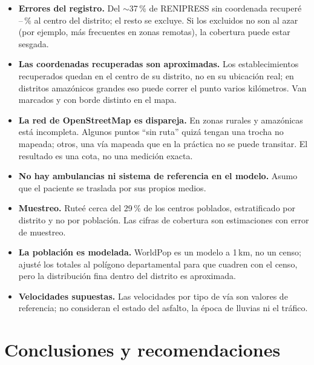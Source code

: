 \documentclass[12pt,a4paper]{article}
\newcommand{\FloatBarrier}{\par\bigskip}    %
\providecommand{\fraccionMuestra}{29}
\providecommand{\tasaRecuperacion}{--}
\begin{document}
\begin{itemize}
\item \textbf{Errores del registro.} Del $\sim$37\,\% de RENIPRESS sin
coordenada recuper\'e \tasaRecuperacion\,\% al centro del distrito; el resto
se excluye. Si los excluidos no son al azar (por ejemplo, m\'as frecuentes en
zonas remotas), la cobertura puede estar sesgada.
\item \textbf{Las coordenadas recuperadas son aproximadas.} Los
establecimientos recuperados quedan en el centro de su distrito, no en su
ubicaci\'on real; en distritos amaz\'onicos grandes eso puede correr el punto
varios kil\'ometros. Van marcados y con borde distinto en el mapa.
\item \textbf{La red de OpenStreetMap es dispareja.} En zonas rurales y
amaz\'onicas est\'a incompleta. Algunos puntos ``sin ruta'' quiz\'a tengan
una trocha no mapeada; otros, una v\'ia mapeada que en la pr\'actica no se
puede transitar. El resultado es una cota, no una medici\'on exacta.
\item \textbf{No hay ambulancias ni sistema de referencia en el modelo.}
Asumo que el paciente se traslada por sus propios medios.
\item \textbf{Muestreo.} Rute\'e cerca del \fraccionMuestra\,\% de los
centros poblados, estratificado por distrito y no por poblaci\'on. Las
cifras de cobertura son estimaciones con error de muestreo.
\item \textbf{La poblaci\'on es modelada.} WorldPop es un modelo a 1\,km, no
un censo; ajust\'e los totales al pol\'igono departamental para que cuadren
con el censo, pero la distribuci\'on fina dentro del distrito es aproximada.
\item \textbf{Velocidades supuestas.} Las velocidades por tipo de v\'ia son
valores de referencia; no consideran el estado del asfalto, la \'epoca de
lluvias ni el tr\'afico.
\end{itemize}

\FloatBarrier
\section{Conclusiones y recomendaciones}
\end{document}
